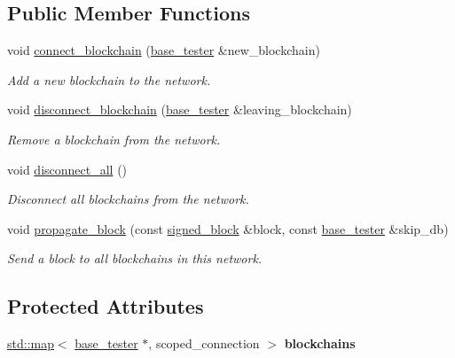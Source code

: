 \subsection*{Public Member Functions}
\begin{DoxyCompactItemize}
\item 
void \mbox{\hyperlink{classaacio_1_1testing_1_1tester__network_ad830c579e32ccfd215de62ff4f45c6e5}{connect\+\_\+blockchain}} (\mbox{\hyperlink{classaacio_1_1testing_1_1base__tester}{base\+\_\+tester}} \&new\+\_\+blockchain)
\begin{DoxyCompactList}\small\item\em Add a new blockchain to the network. \end{DoxyCompactList}\item 
void \mbox{\hyperlink{classaacio_1_1testing_1_1tester__network_ad42cdacd71d075210517b3b76e5b982c}{disconnect\+\_\+blockchain}} (\mbox{\hyperlink{classaacio_1_1testing_1_1base__tester}{base\+\_\+tester}} \&leaving\+\_\+blockchain)
\begin{DoxyCompactList}\small\item\em Remove a blockchain from the network. \end{DoxyCompactList}\item 
\mbox{\label{classaacio_1_1testing_1_1tester__network_a8e94db054e9c70766a0e7031cbf7b638}} 
void \mbox{\hyperlink{classaacio_1_1testing_1_1tester__network_a8e94db054e9c70766a0e7031cbf7b638}{disconnect\+\_\+all}} ()
\begin{DoxyCompactList}\small\item\em Disconnect all blockchains from the network. \end{DoxyCompactList}\item 
void \mbox{\hyperlink{classaacio_1_1testing_1_1tester__network_a8d068f63852dc37eb30ae8fd9ce59550}{propagate\+\_\+block}} (const \mbox{\hyperlink{structaacio_1_1chain_1_1signed__block}{signed\+\_\+block}} \&block, const \mbox{\hyperlink{classaacio_1_1testing_1_1base__tester}{base\+\_\+tester}} \&skip\+\_\+db)
\begin{DoxyCompactList}\small\item\em Send a block to all blockchains in this network. \end{DoxyCompactList}\end{DoxyCompactItemize}
\subsection*{Protected Attributes}
\begin{DoxyCompactItemize}
\item 
\mbox{\label{classaacio_1_1testing_1_1tester__network_a59c5e3b5447fb0c9b915907d144a4838}} 
\mbox{\hyperlink{classstd_1_1map}{std\+::map}}$<$ \mbox{\hyperlink{classaacio_1_1testing_1_1base__tester}{base\+\_\+tester}} $\ast$, scoped\+\_\+connection $>$ {\bfseries blockchains}
\end{DoxyCompactItemize}


